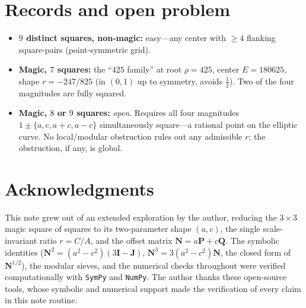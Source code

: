 \documentclass[11pt]{article}
\newcommand{\N}{\mathbf{N}}
\newcommand{\PP}{\mathbf{P}}
\newcommand{\QQ}{\mathbf{Q}}
\newcommand{\JJ}{\mathbf{J}}
\newcommand{\I}{\mathbf{I}}
\begin{document}
\section{Records and open problem}

\begin{itemize}[nosep]
\item \textbf{$9$ distinct squares, non-magic:} easy---any center with
$\ge 4$ flanking square-pairs (point-symmetric grid).
\item \textbf{Magic, $7$ squares:} the ``$425$ family'' at root $\rho=425$,
center $E=180625$, shape $r=-247/825$ (in $(0,1)$ up to symmetry, avoids
$\tfrac12$). Two of the four magnitudes are fully squared.
\item \textbf{Magic, $8$ or $9$ squares:} \emph{open}. Requires all four
magnitudes $1\pm\{a,c,a+c,a-c\}$ simultaneously square---a rational point on the
elliptic curve. No local/modular obstruction rules out any admissible $r$; the
obstruction, if any, is global.
\end{itemize}

\section*{Acknowledgments}

This note grew out of an extended exploration by the author, reducing the
$3\times3$ magic square of squares to its two-parameter shape $(a,c)$, the single
scale-invariant ratio $r=C/A$, and the offset matrix $\N=a\PP+c\QQ$. The symbolic
identities ($\N^2=(a^2-c^2)(3\I-\JJ)$, $\N^3=3(a^2-c^2)\N$, the closed form of
$\N^{1/2}$), the modular sieves, and the numerical checks throughout were verified
computationally with \texttt{SymPy} and \texttt{NumPy}. The author thanks these
open-source tools, whose symbolic and numerical support made the verification of
every claim in this note routine.
\end{document}

